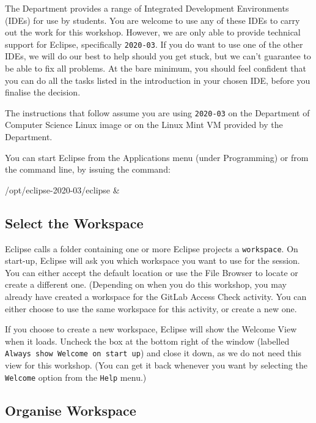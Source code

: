 \documentclass[
]{book}
\newenvironment{Shaded}{\begin{snugshade}}{\end{snugshade}}
\newcommand{\NormalTok}[1]{#1}
\begin{document}
The Department provides a range of Integrated Development Environments (IDEs) for use by students. You are welcome to use any of these IDEs to carry out the work for this workshop. However, we are only able to provide technical support for Eclipse, specifically \texttt{2020-03}. If you do want to use one of the other IDEs, we will do our best to help should you get stuck, but we can't guarantee to be able to fix all problems. At the bare minimum, you should feel confident that you can do all the tasks listed in the introduction in your chosen IDE, before you finalise the decision.

The instructions that follow assume you are using \texttt{2020-03} on the Department of Computer Science Linux image or on the Linux Mint VM provided by the Department.

You can start Eclipse from the Applications menu (under Programming) or from the command line, by issuing the command:

\begin{Shaded}
\begin{Highlighting}[]
\NormalTok{/opt/eclipse{-}2020{-}03/eclipse \&}
\end{Highlighting}
\end{Shaded}

\hypertarget{selectw}{%
\subsection{Select the Workspace}\label{selectw}}

Eclipse calls a folder containing one or more Eclipse projects a \texttt{workspace}. On start-up, Eclipse will ask you which workspace you want to use for the session. You can either accept the default location or use the File Browser to locate or create a different one. (Depending on when you do this workshop, you may already have created a workspace for the GitLab Access Check activity. You can either choose to use the same workspace for this activity, or create a new one.

If you choose to create a new workspace, Eclipse will show the Welcome View when it loads. Uncheck the box at the bottom right of the window (labelled \texttt{Always\ show\ Welcome\ on\ start\ up}) and close it down, as we do not need this view for this workshop. (You can get it back whenever you want by selecting the \texttt{Welcome} option from the \texttt{Help} menu.)

\hypertarget{organisew}{%
\subsection{Organise Workspace}\label{organisew}}
\end{document}
